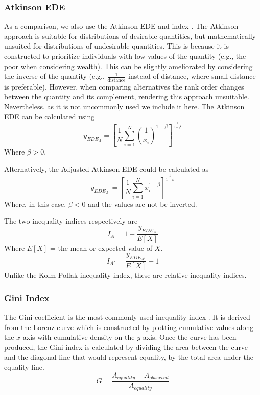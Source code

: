 \documentclass[final,3p,times,onecolumn,sort&compress]{elsarticle}
\begin{document}
\subsubsection{Atkinson EDE}
As a comparison, we also use the Atkinson EDE and index \citep{Atkinson1970-mr}.
The Atkinson approach is suitable for distributions of desirable quantities, but mathematically unsuited for distributions of undesirable quantities.
This is because it is constructed to prioritize individuals with low values of the quantity (e.g., the poor when considering wealth).
This can be slightly ameliorated by considering the inverse of the quantity (e.g., $\frac{1}{\textrm{distance}}$ instead of distance, where small distance is preferable). 
However, when comparing alternatives the rank order changes between the quantity and its complement, rendering this approach unsuitable. 
Nevertheless, as it is not uncommonly used we include it here. 
The Atkinson EDE can be calculated using
\begin{equation}
    y_{EDE_A} = \left[ \frac{1}{N}\sum_{i=1}^N 
    \left( \frac{1}{x_i}
   \right) ^{1-\beta}\right]^{\frac{1}{1-\beta}} 
\end{equation}
Where $\beta > 0$.

Alternatively, the Adjusted Atkinson EDE could be calculated \citep{Sheriff2020-ge} as 
\begin{equation}
    y_{EDE_{A'}} = \left[ \frac{1}{N} \sum_{i=1}^N x_i^{1-\beta}\right]^{\frac{1}{1-\beta}}
\end{equation}
Where, in this case, $\beta < 0$ and the values are not be inverted.

The two inequality indices respectively are
\begin{equation}
    I_A = 1 - \frac{y_{EDE_A}}{E[X]}
\end{equation}
Where $E[X]$ = the mean or expected value of $X$.
\begin{equation}
    I_{A'} = \frac{y_{EDE_{A'}}}{E[X]} -1
\end{equation}
Unlike the Kolm-Pollak inequality index, these are relative inequality indices.

\subsubsection{Gini Index}
The Gini coefficient is the most commonly used inequality index \citep{Maguire2011-fi}.
It is derived from the Lorenz curve which is constructed by plotting cumulative values along the $x$ axis with cumulative density on the $y$ axis. 
Once the curve has been produced, the Gini index is calculated by dividing the area between the curve and the diagonal line that would represent equality, by the total area under the equality line.
\begin{equation}
    G = \frac{A_{equality}-A_{observed}}{A_{equality}}
\end{equation}
\end{document}
